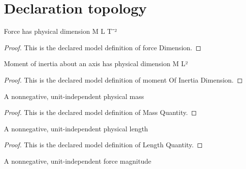\section{Declaration topology}
\begin{definition}
  \label{def:physics:phyx-mini-0820:phyxminiproblems-problemphyxmini0820-forcedimension}
  Force has physical dimension M L T⁻²
\end{definition}
\begin{proof}
  This is the declared model definition of force Dimension.
\end{proof}
\begin{definition}
  \label{def:physics:phyx-mini-0820:phyxminiproblems-problemphyxmini0820-momentofinertiadimension}
  Moment of inertia about an axis has physical dimension M L²
\end{definition}
\begin{proof}
  This is the declared model definition of moment Of Inertia Dimension.
\end{proof}
\begin{definition}
  \label{def:physics:phyx-mini-0820:phyxminiproblems-problemphyxmini0820-massquantity}
  A nonnegative, unit-independent physical mass
\end{definition}
\begin{proof}
  This is the declared model definition of Mass Quantity.
\end{proof}
\begin{definition}
  \label{def:physics:phyx-mini-0820:phyxminiproblems-problemphyxmini0820-lengthquantity}
  A nonnegative, unit-independent physical length
\end{definition}
\begin{proof}
  This is the declared model definition of Length Quantity.
\end{proof}
\begin{definition}
  \label{def:physics:phyx-mini-0820:phyxminiproblems-problemphyxmini0820-forcemagnitudequantity}
  A nonnegative, unit-independent force magnitude
\end{definition}
